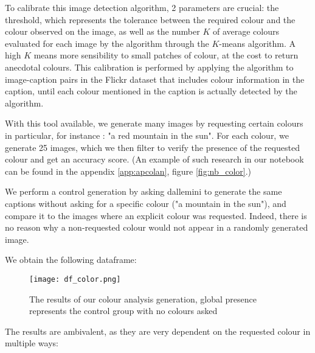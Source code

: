 \documentclass{article}
\begin{document}
\begin{multicols}{2}
To calibrate this image detection algorithm, 2 parameters are crucial: the threshold, which represents the tolerance between the required colour and the colour observed on the image, as well as the number $K$ of average colours evaluated for each image by the algorithm through the $K$-means algorithm. A high $K$ means more sensibility to small patches of colour, at the cost to return anecdotal colours. This calibration is performed by applying the algorithm to image-caption pairs in the Flickr dataset that includes colour information in the caption, until each colour mentioned in the caption is actually detected by the algorithm.

With this tool available, we generate many images by requesting certain colours in particular, for instance : "a red mountain in the sun". For each colour, we generate 25 images, which we then filter to verify the presence of the requested colour and get an accuracy score. (An example of such research in our notebook can be found in the appendix \ref{app:apcolan}, figure \ref{fig:nb_color}.)

We perform a control generation by asking \gls{dallemini} to generate the same captions without asking for a specific colour ("a mountain in the sun"), and compare it to the images where an explicit colour was requested. Indeed, there is no reason why a non-requested colour would not appear in a randomly generated image.

We obtain the following dataframe:

\begin{figure}[H]
    \centering
    \texttt{[image: df\_color.png]}
    \caption{The results of our colour analysis generation, global presence represents the control group with no colours asked}
    \label{fig:df_color}
\end{figure}

The results are ambivalent, as they are very dependent on the requested colour in multiple ways: 


\end{multicols}
\end{document}
